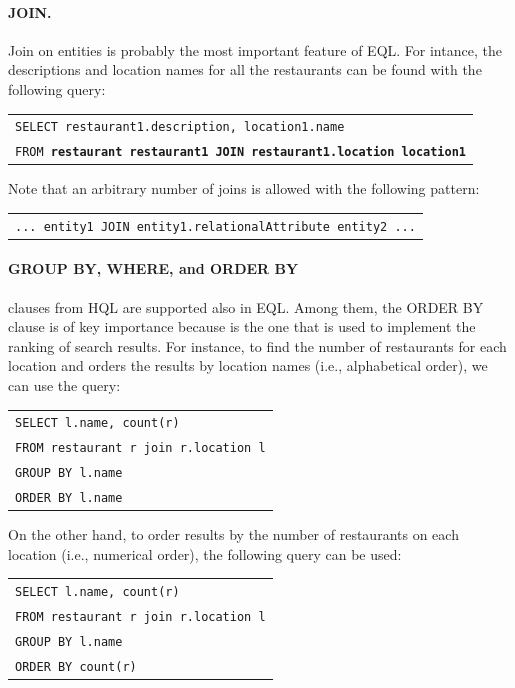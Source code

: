 \paragraph{JOIN.}
Join on entities is probably the most important feature of EQL. For intance, the descriptions and location names for all the restaurants can be found with the following query:
\begin{center}
\begin{tabular}{l}
\texttt{SELECT restaurant1.description, location1.name} \\
\texttt{FROM \textbf{restaurant restaurant1 JOIN restaurant1.location location1}}
\end{tabular}
\end{center}
Note that an arbitrary number of joins is allowed with the following pattern:
\begin{center}
\begin{tabular}{l}
\texttt{... entity1 JOIN entity1.relationalAttribute entity2 ...}\\
\end{tabular}
\end{center}


\paragraph{GROUP BY, WHERE, and ORDER BY} clauses from HQL are supported also in EQL. Among them, the ORDER BY clause is of key importance because is the one that is used to implement the ranking of search results. For instance, to find the number of restaurants for each location and orders the results by location names (i.e., alphabetical order), we can use the query:
\begin{center}
\begin{tabular}{l}
\texttt{SELECT l.name, count(r)} \\
\texttt{FROM restaurant r join r.location l} \\
\texttt{GROUP BY l.name} \\
\texttt{ORDER BY l.name} \\
\end{tabular}
\end{center}
On the other hand, to order results by the number of restaurants on each location (i.e., numerical order), the following query can be used:
\begin{center}
\begin{tabular}{l}
\texttt{SELECT l.name, count(r)} \\
\texttt{FROM restaurant r join r.location l} \\
\texttt{GROUP BY l.name} \\
\texttt{ORDER BY count(r)} \\
\end{tabular}
\end{center}


